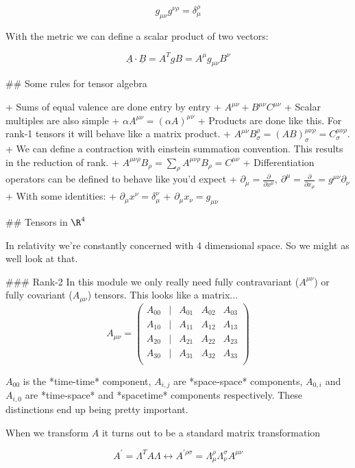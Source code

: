 $$
g_{\mu\nu}g^{\nu\rho} = \delta^\rho_\mu
$$

With the metric we can define a scalar product of two vectors:

$$
\underline{A}\cdot\underline{B} = A^TgB = A^\mu g_{\mu\nu}B^\nu

$$

## Some rules for tensor algebra


+ Sums of equal valence are done entry by entry 
  + $A^{\mu\nu} + B^{\mu\nu}  C^{\mu\nu}$
+ Scalar multiples are also simple 
  + $\alpha A^{\mu\nu} = (\alpha A)^{\mu\nu}$
+ Products are done like this. For rank-1 tensors it will behave like a matrix product.
  + $A^{\mu\nu}B^\rho_\sigma = (AB)^{\mu\nu\rho}_\sigma =  C^{\mu\nu\rho}_\sigma$.
+ We can define a contraction with einstein summation convention. This results in the reduction of rank.
  + $A^{\mu\nu\rho}B_\rho = \sum_\rho A^{\mu\nu\rho}B_\rho = C^{\mu\nu}$
+ Differentiation operators can be defined to behave like you'd expect 
  + $\partial_\mu = \frac{\partial}{\partial {x^\mu}},\ 
\partial^\mu = \frac{\partial}{\partial {x_\mu}} = g^{\mu\nu}\partial_\nu$
  + With some identities:  
  + $\partial_\mu x^\nu = \delta^\nu_\mu$
  + $\partial_\mu x_\nu = g_{\mu\nu}$

## Tensors in $\R^4$

In relativity we're constantly concerned with 4 dimensional space. So we might as well look at that.

### Rank-2
In this module we only really need fully contravariant ($A^{\mu\nu}$) or fully covariant ($A_{\mu\nu}$) tensors. This looks like a matrix...
$$
A_{\mu\nu} =
\begin{pmatrix}
    A_{00}  &|& A_{01} & A_{02} & A_{03}\\ 
    \hline
    A_{10}  &|& A_{11} & A_{12} & A_{13}\\
    A_{20}  &|& A_{21} & A_{22} & A_{23}\\
    A_{30}  &|& A_{31} & A_{32} & A_{33}\\
\end{pmatrix}
$$

$A_{00}$ is the *time-time* component, $A_{i,j}$ are *space-space* components, $A_{0,i}$ and $A_{i, 0}$ are *time-space* and *spacetime* components respectively. These distinctions end up being pretty important.

When we transform $A$ it turns out to be a standard matrix transformation

$$
A^\prime = \Lambda^TA\Lambda \longleftrightarrow A^{\prime\rho\sigma} = \Lambda^\rho_\mu\Lambda^\sigma_\nu A^{\mu\nu}
$$

